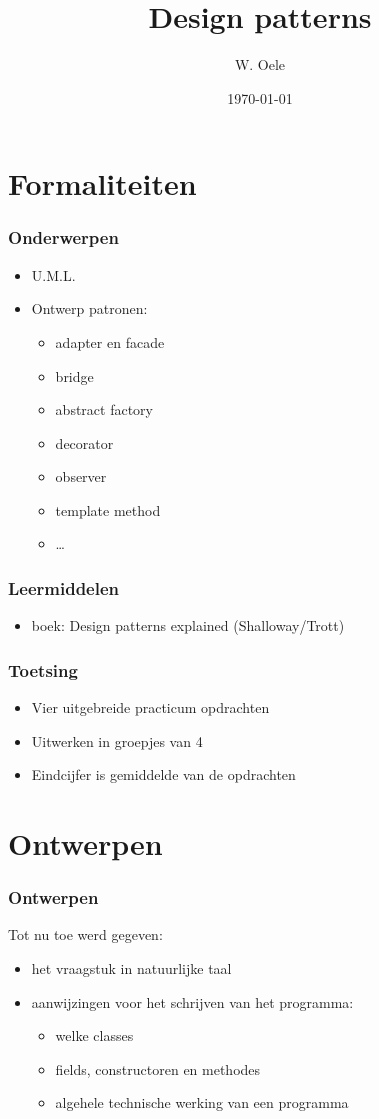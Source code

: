 \documentclass{beamer}
\title{Design patterns}
\author{W. Oele}
\date{\today}
\begin{document}
\frame{\titlepage}

\section{Formaliteiten}
\begin{frame}
\frametitle{Onderwerpen}
\begin{itemize}
\item U.M.L.
\item Ontwerp patronen:
  \begin{itemize}
  \item adapter en facade
  \item bridge
  \item abstract factory
  \item decorator
  \item observer
  \item template method
  \item \ldots
  \end{itemize}
\end{itemize}
\end{frame}

\begin{frame}
\frametitle{Leermiddelen}
\begin{itemize}
\item boek: Design patterns explained (Shalloway/Trott)
\end{itemize}

\end{frame}
\begin{frame}
\frametitle{Toetsing}
\begin{itemize}
\item Vier uitgebreide practicum opdrachten
\item Uitwerken in groepjes van 4
\item Eindcijfer is gemiddelde van de opdrachten
\end{itemize}
\end{frame}

\section{Ontwerpen}

\begin{frame}
\frametitle{Ontwerpen}
Tot nu toe werd gegeven:\pause
\begin{itemize}
\item het vraagstuk in natuurlijke taal\pause
\item aanwijzingen voor het schrijven van het programma:
  \begin{itemize}
  \item welke classes
  \item fields, constructoren en methodes
  \item algehele technische werking van een programma
  \end{itemize}
\end{itemize}
\end{frame}
\end{document}
